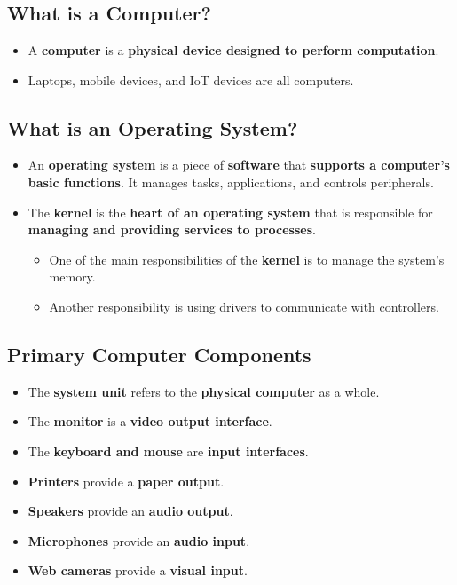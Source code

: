 \documentclass{article}
\begin{document}
    \section*{}
    
    \subsection*{What is a Computer?}
    \begin{itemize}
        \item A \textbf{computer} is a \textbf{physical device designed to perform computation}.
        \item Laptops, mobile devices, and IoT devices are all computers.
    \end{itemize}
    
    \subsection*{What is an Operating System?}
    \begin{itemize}
        \item An \textbf{operating system} is a piece of \textbf{software} that \textbf{supports a computer's basic functions}. It manages tasks, applications, and controls peripherals.
        \item The \textbf{kernel} is the \textbf{heart of an operating system} that is responsible for \textbf{managing and providing services to processes}.
        \begin{itemize}
            \item One of the main responsibilities of the \textbf{kernel} is to manage the system's memory.
            \item Another responsibility is using drivers to communicate with controllers.
        \end{itemize}
    \end{itemize}

    \subsection*{Primary Computer Components}
    \begin{itemize}
        \item The \textbf{system unit} refers to the \textbf{physical computer} as a whole.
        \item The \textbf{monitor} is a \textbf{video output interface}.
        \item The \textbf{keyboard and mouse} are \textbf{input interfaces}.
        \item \textbf{Printers} provide a \textbf{paper output}.
        \item \textbf{Speakers} provide an \textbf{audio output}.
        \item \textbf{Microphones} provide an \textbf{audio input}.
        \item \textbf{Web cameras} provide a \textbf{visual input}.
    \end{itemize}
\end{document}
